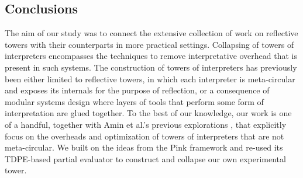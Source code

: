 \documentclass[a4paper,12pt,twoside,openright]{report}
\theoremstyle{definition}
\begin{document}
\subsection{Conclusions}
The aim of our study was to connect the extensive collection of work on reflective towers with their counterparts in more practical settings. Collapsing of towers of interpreters encompasses the techniques to remove interpretative overhead that is present in such systems. The construction of towers of interpreters has previously been either limited to reflective towers, in which each interpreter is meta-circular and exposes its internals for the purpose of reflection, or a consequence of modular systems design where layers of tools that perform some form of interpretation are glued together. To the best of our knowledge, our work is one of a handful, together with Amin et al.'s previous explorations \cite{amin2017collapsing}, that explicitly focus on the overheads and optimization of towers of interpreters that are not meta-circular. We built on the ideas from the Pink framework and re-used its TDPE-based partial evaluator to construct and collapse our own experimental tower.
\end{document}
